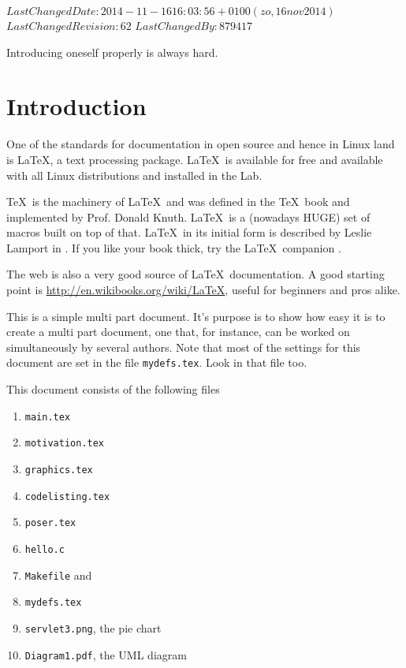 %
{$LastChangedDate: 2014-11-16 16:03:56 +0100 (zo, 16 nov 2014) $}%
{$LastChangedRevision: 62 $}%
{$LastChangedBy: 879417 $}

\renewcommand\TheFile{intro.tex}

\begin{savequote}[8cm]
  \sffamily
  Introducing oneself properly is always hard.
\end{savequote}
\chapter{Introduction}
\setcounter{page}{1}
One of the standards for documentation in open source and hence in
Linux land is \LaTeX, a text processing package. \LaTeX\ is available
for free and available with all Linux distributions and installed in
the Lab.

\TeX\ is the machinery of \LaTeX\ and was defined in the \TeX\ book
\citep{texbook} and implemented by
Prof. Donald Knuth. \LaTeX\ is a (nowadays HUGE) set of macros built
on top of that. \LaTeX\ in its initial form is described by Leslie
Lamport in \citep{latexbook}. If you like your book thick, try the
\LaTeX\ companion \citep{latexcompanion}.

The web is also a very good source of \LaTeX\ documentation. A good
starting point is \url{http://en.wikibooks.org/wiki/LaTeX}, useful for
beginners and pros alike.

This is a simple multi part document. It's purpose is to show how easy it is
to create a multi part document, one that, for instance, can be worked on 
simultaneously by several authors. Note that most of the settings for
this document are set in the file \texttt{mydefs.tex}. 
Look in that file too.

This document consists of the following files
\begin{enumerate}[noitemsep,topsep=0pt,parsep=0pt,partopsep=0pt]
\item \texttt{main.tex}
\item \texttt{motivation.tex}
\item \texttt{graphics.tex}
\item \texttt{codelisting.tex}
\item \texttt{poser.tex}
\item \texttt{hello.c}
\item \texttt{Makefile} and
\item \texttt{mydefs.tex}
\item \texttt{servlet3.png}, the pie chart
\item \texttt{Diagram1.pdf}, the UML diagram
\end{enumerate} 

